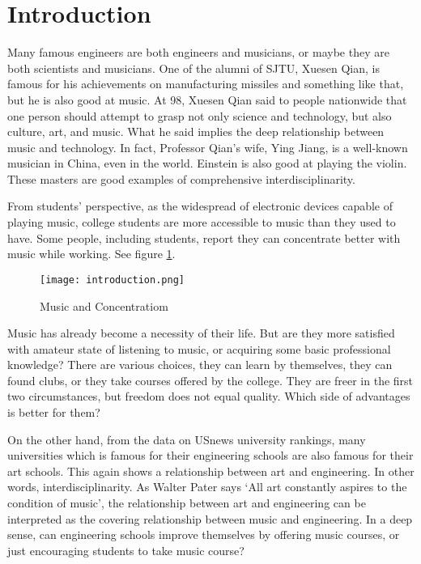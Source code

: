 \section{Introduction}
Many famous engineers are both engineers and musicians, or maybe they are both scientists and musicians. 
One of the alumni of SJTU, Xuesen Qian, is famous for his achievements on manufacturing missiles and something like that, but he is also good at music. At 98, Xuesen Qian said to people nationwide that one
 person should attempt to grasp not only science and technology, but also culture, art, and music. What he
  said implies the deep relationship between music and technology. In fact, Professor Qian’s wife, Ying 
  Jiang, is a well-known musician in China, even in the world. Einstein is also good at playing the
   violin. These masters are good examples of comprehensive interdisciplinarity.\par
From students’ perspective, as the widespread of electronic devices capable of playing music, college
 students are more accessible to music than they used to have. Some people, including students, report they
 can concentrate better with music while working. See figure \ref{Music and Concentration}.

\begin{figure}[h]
\centering
\texttt{[image: introduction.png]}
\label{Music and Concentration}
\caption{Music and Concentratiom}
\end{figure}

Music has already become a necessity of their life. But are they more satisfied with amateur state of listening to music, or acquiring some basic professional knowledge? There are various choices, they can learn by themselves, they can found clubs, or they take courses offered by the college. They are freer in the first two circumstances, but freedom does not equal quality. Which side of advantages is better for them?\par
On the other hand, from the data on USnews university rankings, many universities which is famous for their engineering schools are also famous for their art schools. This again shows a relationship between art and engineering. In other words, interdisciplinarity. As Walter Pater says ‘All art constantly aspires to the condition of music’, the relationship between art and engineering can be interpreted as the covering relationship between music and engineering. In a deep sense, can engineering schools improve themselves by offering music courses, or just encouraging students to take music course?\par
